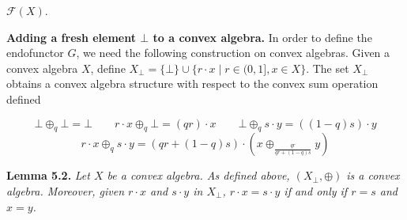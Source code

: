 \hypertarget{html:S5.SS0.SSS0.P0.SPx2.p2.m12}{}\({{\mathcal{F}}(X)}\).
\par\medskip
\hypertarget{html:S5.SS0.SSS0.P0.SPx3}{} \par\noindent\textbf{Adding a fresh element %
\hypertarget{html:S5.SS0.SSS0.P0.SPx3.m1}{}\({\bot}\) to a convex algebra.}\quad  %
\hypertarget{html:S5.SS0.SSS0.P0.SPx3.p1}{} In order to define the endofunctor %
\hypertarget{html:S5.SS0.SSS0.P0.SPx3.p1.m1}{}\({G}\), we need the following construction on convex algebras. Given a convex algebra %
\hypertarget{html:S5.SS0.SSS0.P0.SPx3.p1.m2}{}\({X}\), define %
\hypertarget{html:S5.SS0.SSS0.P0.SPx3.p1.m3}{}\({X_{\bot}=\{\bot\}\cup\{r\cdot x\mid r\in(0,1],x\in X\}}\). The set %
\hypertarget{html:S5.SS0.SSS0.P0.SPx3.p1.m4}{}\({X_{\bot}}\) obtains a convex algebra structure with respect to the convex sum operation defined
\par\medskip
\hypertarget{html:S8.EGx6}{} %
\hypertarget{html:S5.Ex1}{}  %
\hypertarget{html:S5.Ex1.m1}{}\[\displaystyle\bot\oplus_{q}\bot=\bot\qquad r\cdot x\oplus_{q}\bot=(qr)\cdot x\qquad\bot\oplus_{q}s\cdot y=((1-q)s)\cdot y\]   %
\hypertarget{html:S5.Ex2}{}  %
\hypertarget{html:S5.Ex2.m1}{}\[\displaystyle r\cdot x\oplus_{q}s\cdot y=(qr+(1-q)s)\cdot(x\oplus_{\frac{qr}{qr+(1-q)s}}y)\]     %
\hypertarget{html:S5.Thmtheorem2}{} \par\noindent\textbf{\textbf{Lemma 5.2}\textbf{.}}\quad  %
\hypertarget{html:S5.Thmtheorem2.p1}{} \emph{Let %
\hypertarget{html:S5.Thmtheorem2.p1.m1}{}\({X}\) be a convex algebra. As defined above, %
\hypertarget{html:S5.Thmtheorem2.p1.m2}{}\({(X_{\bot},\oplus)}\) is a convex algebra. Moreover, given %
\hypertarget{html:S5.Thmtheorem2.p1.m3}{}\({r\cdot x}\) and %
\hypertarget{html:S5.Thmtheorem2.p1.m4}{}\({s\cdot y}\) in %
\hypertarget{html:S5.Thmtheorem2.p1.m5}{}\({X_{\bot}}\), %
\hypertarget{html:S5.Thmtheorem2.p1.m6}{}\({r\cdot x=s\cdot y}\) if and only if %
\hypertarget{html:S5.Thmtheorem2.p1.m7}{}\({r=s}\) and %
\hypertarget{html:S5.Thmtheorem2.p1.m8}{}\({x=y}\).}

